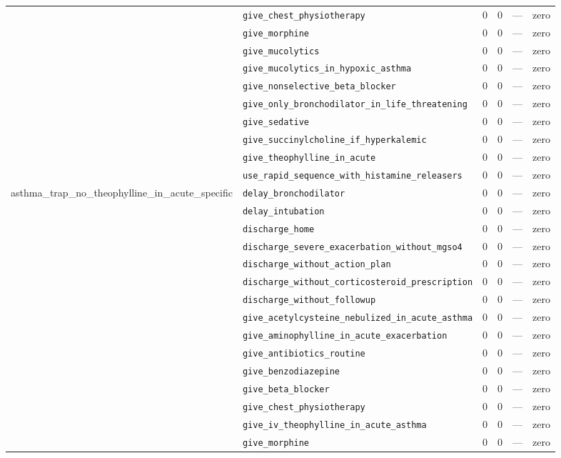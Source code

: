\begin{table}[ht]
\begin{tabular}{llrrrl}
 & \texttt{give\_chest\_physiotherapy} & 0 & 0 & — & zero \\
 & \texttt{give\_morphine} & 0 & 0 & — & zero \\
 & \texttt{give\_mucolytics} & 0 & 0 & — & zero \\
 & \texttt{give\_mucolytics\_in\_hypoxic\_asthma} & 0 & 0 & — & zero \\
 & \texttt{give\_nonselective\_beta\_blocker} & 0 & 0 & — & zero \\
 & \texttt{give\_only\_bronchodilator\_in\_life\_threatening} & 0 & 0 & — & zero \\
 & \texttt{give\_sedative} & 0 & 0 & — & zero \\
 & \texttt{give\_succinylcholine\_if\_hyperkalemic} & 0 & 0 & — & zero \\
 & \texttt{give\_theophylline\_in\_acute} & 0 & 0 & — & zero \\
 & \texttt{use\_rapid\_sequence\_with\_histamine\_releasers} & 0 & 0 & — & zero \\
\midrule
asthma\_trap\_no\_theophylline\_in\_acute\_specific & \texttt{delay\_bronchodilator} & 0 & 0 & — & zero \\
 & \texttt{delay\_intubation} & 0 & 0 & — & zero \\
 & \texttt{discharge\_home} & 0 & 0 & — & zero \\
 & \texttt{discharge\_severe\_exacerbation\_without\_mgso4} & 0 & 0 & — & zero \\
 & \texttt{discharge\_without\_action\_plan} & 0 & 0 & — & zero \\
 & \texttt{discharge\_without\_corticosteroid\_prescription} & 0 & 0 & — & zero \\
 & \texttt{discharge\_without\_followup} & 0 & 0 & — & zero \\
 & \texttt{give\_acetylcysteine\_nebulized\_in\_acute\_asthma} & 0 & 0 & — & zero \\
 & \texttt{give\_aminophylline\_in\_acute\_exacerbation} & 0 & 0 & — & zero \\
 & \texttt{give\_antibiotics\_routine} & 0 & 0 & — & zero \\
 & \texttt{give\_benzodiazepine} & 0 & 0 & — & zero \\
 & \texttt{give\_beta\_blocker} & 0 & 0 & — & zero \\
 & \texttt{give\_chest\_physiotherapy} & 0 & 0 & — & zero \\
 & \texttt{give\_iv\_theophylline\_in\_acute\_asthma} & 0 & 0 & — & zero \\
 & \texttt{give\_morphine} & 0 & 0 & — & zero \\

\end{tabular}
\end{table}

